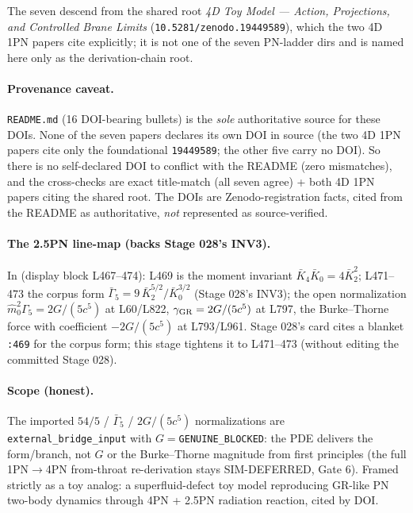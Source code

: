 The seven descend from the shared root \emph{4D Toy Model --- Action, Projections, and Controlled Brane Limits}
(\texttt{10.5281/zenodo.19449589}), which the two 4D 1PN papers cite explicitly; it is not one of the seven PN-ladder
dirs and is named here only as the derivation-chain root.

\paragraph{Provenance caveat.}
\nolinkurl{README.md} (16 DOI-bearing bullets) is the \emph{sole} authoritative source for these DOIs. None of the
seven papers declares its own DOI in source (the two 4D 1PN papers cite only the foundational \texttt{19449589}; the
other five carry no DOI). So there is no self-declared DOI to conflict with the README (zero mismatches), and the
cross-checks are exact title-match (all seven agree) + both 4D 1PN papers citing the shared root. The DOIs are
Zenodo-registration facts, cited from the README as authoritative, \emph{not} represented as source-verified.

\paragraph{The 2.5PN line-map (backs Stage 028's INV3).}
In  (display block L467--474): L469 is the moment invariant
\(\bar K_4\bar K_0=4\bar K_2^2\); L471--473 the corpus form \(\bar\Gamma_5=9\,\bar K_2^{5/2}/\bar K_0^{3/2}\) (Stage
028's INV3); the open normalization \(\hat m_0^2\Gamma_5=2G/(5c^5)\) at L60/L822, \(\gamma_{\rm GR}=2G/(5c^5)\) at
L797, the Burke--Thorne force with coefficient \(-2G/(5c^5)\) at L793/L961. Stage 028's card cites a blanket
\texttt{:469} for the corpus form; this stage tightens it to L471--473 (without editing the committed Stage 028).

\paragraph{Scope (honest).}
The imported \(54/5\) / \(\bar\Gamma_5\) / \(2G/(5c^5)\) normalizations are \texttt{external\_bridge\_input} with
\(G=\)\texttt{GENUINE\_BLOCKED}: the PDE delivers the form/branch, not \(G\) or the Burke--Thorne magnitude from first
principles (the full 1PN\(\to\)4PN from-throat re-derivation stays SIM-DEFERRED, Gate 6). Framed strictly as a toy
analog: a superfluid-defect toy model reproducing GR-like PN two-body dynamics through 4PN + 2.5PN radiation reaction,
cited by DOI.

